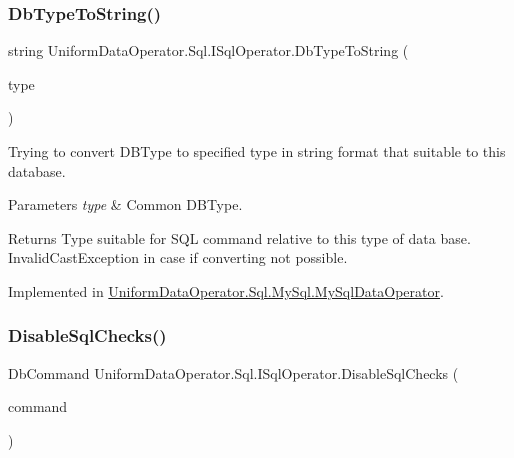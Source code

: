 \subsubsection{\texorpdfstring{Db\+Type\+To\+String()}{DbTypeToString()}}
{\footnotesize\ttfamily string Uniform\+Data\+Operator.\+Sql.\+I\+Sql\+Operator.\+Db\+Type\+To\+String (\begin{DoxyParamCaption}\item[{Db\+Type}]{type }\end{DoxyParamCaption})}



Trying to convert D\+B\+Type to specified type in string format that suitable to this database. 


\begin{DoxyParams}{Parameters}
{\em type} & Common D\+B\+Type.\\
\hline
\end{DoxyParams}
\begin{DoxyReturn}{Returns}
Type suitable for S\+QL command relative to this type of data base. Invalid\+Cast\+Exception in case if converting not possible.
\end{DoxyReturn}


Implemented in \mbox{\hyperlink{class_uniform_data_operator_1_1_sql_1_1_my_sql_1_1_my_sql_data_operator_a7b854ebbcdf31c67716d8c365c321a31}{Uniform\+Data\+Operator.\+Sql.\+My\+Sql.\+My\+Sql\+Data\+Operator}}.

\mbox{\label{interface_uniform_data_operator_1_1_sql_1_1_i_sql_operator_a12d464e0532a3e194b1221eee0c32d34}} 
\subsubsection{\texorpdfstring{Disable\+Sql\+Checks()}{DisableSqlChecks()}\hspace{0.1cm}{\footnotesize\ttfamily [1/2]}}
{\footnotesize\ttfamily Db\+Command Uniform\+Data\+Operator.\+Sql.\+I\+Sql\+Operator.\+Disable\+Sql\+Checks (\begin{DoxyParamCaption}\item[{Db\+Command}]{command }\end{DoxyParamCaption})}




